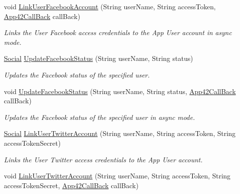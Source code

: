 \begin{DoxyCompactItemize}
void \hyperlink{classcom_1_1shephertz_1_1app42_1_1paas_1_1sdk_1_1csharp_1_1social_1_1_social_service_a870fc6039ec5861feaac543713613c0e}{Link\+User\+Facebook\+Account} (String user\+Name, String access\+Token, \hyperlink{interfacecom_1_1shephertz_1_1app42_1_1paas_1_1sdk_1_1csharp_1_1_app42_call_back}{App42\+Call\+Back} call\+Back)
\begin{DoxyCompactList}\small\item\em Links the User Facebook access credentials to the App User account in async mode. \end{DoxyCompactList}\item 
\hyperlink{classcom_1_1shephertz_1_1app42_1_1paas_1_1sdk_1_1csharp_1_1social_1_1_social}{Social} \hyperlink{classcom_1_1shephertz_1_1app42_1_1paas_1_1sdk_1_1csharp_1_1social_1_1_social_service_a673ec4046f9a08fdc0ad1a1f8bc2c225}{Update\+Facebook\+Status} (String user\+Name, String status)
\begin{DoxyCompactList}\small\item\em Updates the Facebook status of the specified user. \end{DoxyCompactList}\item 
void \hyperlink{classcom_1_1shephertz_1_1app42_1_1paas_1_1sdk_1_1csharp_1_1social_1_1_social_service_a81333ccd350c755aa19654eacd2691c5}{Update\+Facebook\+Status} (String user\+Name, String status, \hyperlink{interfacecom_1_1shephertz_1_1app42_1_1paas_1_1sdk_1_1csharp_1_1_app42_call_back}{App42\+Call\+Back} call\+Back)
\begin{DoxyCompactList}\small\item\em Updates the Facebook status of the specified user in async mode. \end{DoxyCompactList}\item 
\hyperlink{classcom_1_1shephertz_1_1app42_1_1paas_1_1sdk_1_1csharp_1_1social_1_1_social}{Social} \hyperlink{classcom_1_1shephertz_1_1app42_1_1paas_1_1sdk_1_1csharp_1_1social_1_1_social_service_a32d73d4275322217151fba5ca1215411}{Link\+User\+Twitter\+Account} (String user\+Name, String access\+Token, String access\+Token\+Secret)
\begin{DoxyCompactList}\small\item\em Links the User Twitter access credentials to the App User account. \end{DoxyCompactList}\item 
void \hyperlink{classcom_1_1shephertz_1_1app42_1_1paas_1_1sdk_1_1csharp_1_1social_1_1_social_service_aae1d4e222d3788884453bbbc2d1a45ed}{Link\+User\+Twitter\+Account} (String user\+Name, String access\+Token, String access\+Token\+Secret, \hyperlink{interfacecom_1_1shephertz_1_1app42_1_1paas_1_1sdk_1_1csharp_1_1_app42_call_back}{App42\+Call\+Back} call\+Back)

\end{DoxyCompactItemize}
